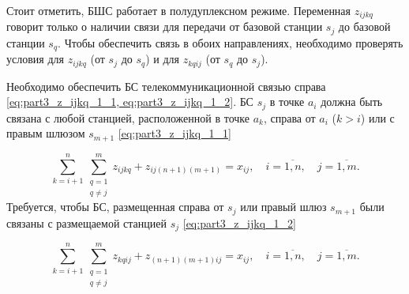 


Стоит отметить, БШС работает в полудуплексном режиме. Переменная $z_{ijkq}$ говорит только о наличии связи для передачи от базовой станции $s_j$ до базовой станции $s_q$. Чтобы обеспечить связь в обоих направлениях, необходимо проверять условия для  $z_{ijkq}$ (от $s_j$ до $s_q$) и для $z_{kqij}$ (от $s_q$ до $s_j$).

Необходимо обеспечить БС телекоммуникационной связью справа \cref{eq:part3_z_ijkq_1_1, eq:part3_z_ijkq_1_2}. БС $ s_j $ в точке $ a_i $ должна быть связана с  любой станцией, расположенной в точке $ a_k $, справа от $ a_i $ ($ k> i $) или с правым шлюзом $ s_{m + 1} $ \cref{eq:part3_z_ijkq_1_1} 

\begin{equation}
  \label{eq:part3_z_ijkq_1_1}
  \sum\limits_{k=i+1}^{n} \sum\limits_{\substack{q = 1\\ q \neq j}}^m z_{ijkq} + z_{ij(n+1)(m+1)} = x_{ij} ,  \quad i = \overline{1, n}, \quad j = \overline{1, m}.
\end{equation}
Требуется, чтобы БС, размещенная справа от $s_j$ или правый шлюз $ s_{m + 1} $  были связаны с размещаемой станцией $ s_j $ \cref{eq:part3_z_ijkq_1_2}

\begin{equation}
  \label{eq:part3_z_ijkq_1_2}
  \sum\limits_{k=i+1}^{n} \sum\limits_{\substack{q = 1\\ q \neq j}}^m z_{kqij} + z_{(n+1)(m+1)ij} = x_{ij} ,  \quad i = \overline{1, n}, \quad j = \overline{1, m}.
\end{equation}

